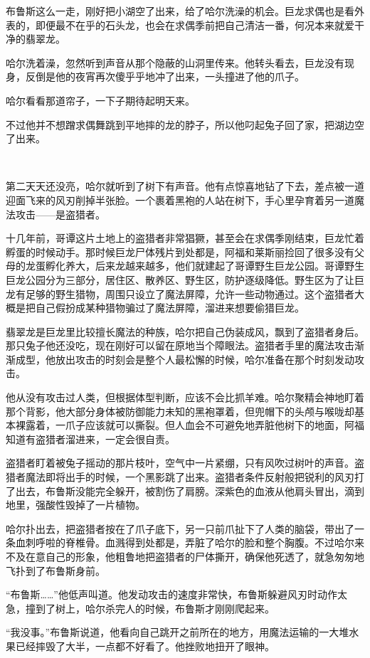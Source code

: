 \documentclass[../main.tex]{subfiles}
\begin{document}
布鲁斯这么一走，刚好把小湖空了出来，给了哈尔洗澡的机会。巨龙求偶也是看外表的，即便最不在乎的石头龙，也会在求偶季前把自己清洁一番，何况本来就爱干净的翡翠龙。

哈尔洗着澡，忽然听到声音从那个隐蔽的山洞里传来。他转头看去，巨龙没有现身，反倒是他的夜宵再次傻乎乎地冲了出来，一头撞进了他的爪子。

哈尔看看那道帘子，一下子期待起明天来。

不过他并不想蹭求偶舞跳到平地摔的龙的脖子，所以他叼起兔子回了家，把湖边空了出来。

~\

第二天天还没亮，哈尔就听到了树下有声音。他有点惊喜地钻了下去，差点被一道迎面飞来的风刃削掉半张脸。一个裹着黑袍的人站在树下，手心里孕育着另一道魔法攻击——是盗猎者。

十几年前，哥谭这片土地上的盗猎者非常猖獗，甚至会在求偶季刚结束，巨龙忙着孵蛋的时候动手。那时候巨龙尸体残片到处都是，阿福和莱斯丽捡回了很多没有父母的龙蛋孵化养大，后来龙越来越多，他们就建起了哥谭野生巨龙公园。哥谭野生巨龙公园分为三部分，居住区、散养区、野生区，防护逐级降低。野生区为了让巨龙有足够的野生猎物，周围只设立了魔法屏障，允许一些动物通过。这个盗猎者大概是把自己假扮成某种猎物骗过了魔法屏障，溜进来想要偷猎巨龙。

翡翠龙是巨龙里比较擅长魔法的种族，哈尔把自己伪装成风，飘到了盗猎者身后。那只兔子他还没吃，现在刚好可以留在原地当个障眼法。盗猎者手里的魔法攻击渐渐成型，他放出攻击的时刻会是整个人最松懈的时候，哈尔准备在那个时刻发动攻击。

他从没有攻击过人类，但根据体型判断，应该不会比抓羊难。哈尔聚精会神地盯着那个背影，他大部分身体被防御能力未知的黑袍罩着，但兜帽下的头颅与喉咙却基本裸露着，一爪子应该就可以撕裂。但人血会不可避免地弄脏他树下的地面，阿福知道有盗猎者溜进来，一定会很自责。

盗猎者盯着被兔子摇动的那片枝叶，空气中一片紧绷，只有风吹过树叶的声音。盗猎者魔法即将出手的时候，一个黑影跳了出来。盗猎者条件反射般把锐利的风刃打了出去，布鲁斯没能完全躲开，被割伤了肩膀。深紫色的血液从他肩头冒出，滴到地里，强酸性毁掉了一片植物。

哈尔扑出去，把盗猎者按在了爪子底下，另一只前爪扯下了人类的脑袋，带出了一条血刺呼啦的脊椎骨。血溅得到处都是，弄脏了哈尔的脸和整个胸腹。不过哈尔来不及在意自己的形象，他粗鲁地把盗猎者的尸体撕开，确保他死透了，就急匆匆地飞扑到了布鲁斯身前。

“布鲁斯……”他低声叫道。他发动攻击的速度非常快，布鲁斯躲避风刃时动作太急，撞到了树上，哈尔杀完人的时候，布鲁斯才刚刚爬起来。

“我没事。”布鲁斯说道，他看向自己跳开之前所在的地方，用魔法运输的一大堆水果已经摔毁了大半，一点都不好看了。他挫败地扭开了眼神。
\end{document}
